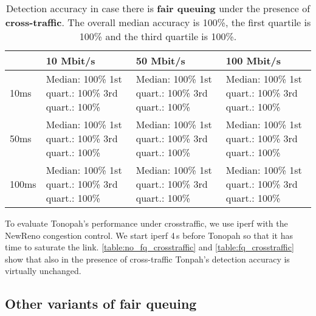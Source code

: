 \documentclass[conference]{IEEEtran}
\begin{document}
\begin{table}
\begin{tabularx}{\columnwidth}{| l | X | X | X |}
\hline
& 10 Mbit/s & 50 Mbit/s & 100 Mbit/s \\ \hline
10ms & Median: 100\% \newline 1st quart.: 100\% \newline 3rd quart.: 100\% & Median: 100\% \newline 1st quart.: 100\% \newline 3rd quart.: 100\% & Median: 100\% \newline 1st quart.: 100\% \newline 3rd quart.: 100\%\\ \hline
50ms & Median: 100\% \newline 1st quart.: 100\% \newline 3rd quart.: 100\% & Median: 100\% \newline 1st quart.: 100\% \newline 3rd quart.: 100\% & Median: 100\% \newline 1st quart.: 100\% \newline 3rd quart.: 100\% \\ \hline
100ms & Median: 100\% \newline 1st quart.: 100\% \newline 3rd quart.: 100\% & Median: 100\% \newline 1st quart.: 100\% \newline 3rd quart.: 100\% & Median: 100\% \newline 1st quart.: 100\% \newline 3rd quart.: 100\% \\ \hline
\end{tabularx}
\caption{Detection accuracy in case there is \textbf{fair queuing} under the presence of \textbf{cross-traffic}.  The overall median accuracy is 100\%, the first quartile is 100\% and the third quartile is 100\%.}
\label{table:fq_crosstraffic}
\end{table}        

To evaluate Tonopah's performance under crosstraffic, we use iperf with the NewReno congestion control. We start iperf 4\,s before Tonopah so that it has time to saturate the link. 
\autoref{table:no_fq_crosstraffic} and \autoref{table:fq_crosstraffic} show that also in the presence of cross-traffic Tonpah's detection accuracy is virtually unchanged. 

\subsection{Other variants of fair queuing}
\end{document}
